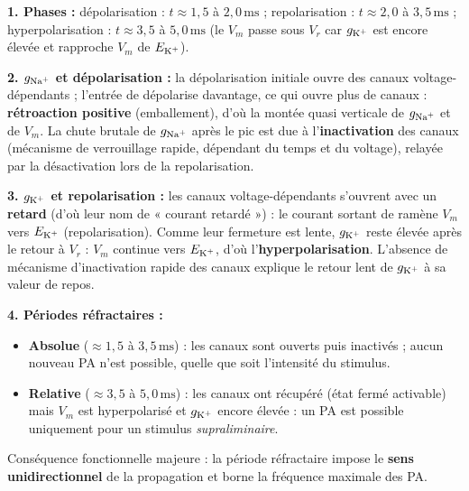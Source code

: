 \documentclass[11pt]{article}
\begin{document}
\begin{corrige}
\textbf{1. Phases :} dépolarisation : $t \approx 1{,}5$ à $2{,}0\,\text{ms}$ ; repolarisation : $t \approx 2{,}0$ à $3{,}5\,\text{ms}$ ; hyperpolarisation : $t \approx 3{,}5$ à $5{,}0\,\text{ms}$ (le $V_m$ passe sous $V_r$ car $g_{\ce{K+}}$ est encore élevée et rapproche $V_m$ de $E_{\ce{K+}}$).

\textbf{2. $g_{\ce{Na+}}$ et dépolarisation :} la dépolarisation initiale ouvre des canaux  voltage-dépendants ; l'entrée de  dépolarise davantage, ce qui ouvre plus de canaux : \textbf{rétroaction positive} (emballement), d'où la montée quasi verticale de $g_{\ce{Na+}}$ et de $V_m$. La chute brutale de $g_{\ce{Na+}}$ après le pic est due à l'\textbf{inactivation} des canaux  (mécanisme de verrouillage rapide, dépendant du temps et du voltage), relayée par la désactivation lors de la repolarisation.

\textbf{3. $g_{\ce{K+}}$ et repolarisation :} les canaux  voltage-dépendants s'ouvrent avec un \textbf{retard} (d'où leur nom de « courant retardé ») : le courant sortant de  ramène $V_m$ vers $E_{\ce{K+}}$ (repolarisation). Comme leur fermeture est lente, $g_{\ce{K+}}$ reste élevée après le retour à $V_r$ : $V_m$ continue vers $E_{\ce{K+}}$, d'où l'\textbf{hyperpolarisation}. L'absence de mécanisme d'inactivation rapide des canaux  explique le retour lent de $g_{\ce{K+}}$ à sa valeur de repos.

\textbf{4. Périodes réfractaires :}
\begin{itemize}
\item \textbf{Absolue} ($\approx 1{,}5$ à $3{,}5\,\text{ms}$) : les canaux  sont ouverts puis inactivés ; aucun nouveau PA n'est possible, quelle que soit l'intensité du stimulus.
\item \textbf{Relative} ($\approx 3{,}5$ à $5{,}0\,\text{ms}$) : les canaux  ont récupéré (état fermé activable) mais $V_m$ est hyperpolarisé et $g_{\ce{K+}}$ encore élevée : un PA est possible uniquement pour un stimulus \emph{supraliminaire}.
\end{itemize}
Conséquence fonctionnelle majeure : la période réfractaire impose le \textbf{sens unidirectionnel} de la propagation et borne la fréquence maximale des PA.
\end{corrige}
\end{document}
